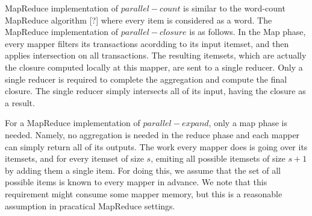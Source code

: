 MapReduce implementation of $parallel-count$ is similar to
the word-count MapReduce algorithm [?] where every item is
considered as a word. The MapReduce implementation of
$parallel-closure$ is as follows. In the Map phase, every
mapper filters its transactions acordding to its input
itemset, and then applies intersection on all transactions. 
The resulting itemsets, which are actually the
closure computed locally at this mapper, are sent to a
single reducer. Only a single reducer is required to
complete the aggregation and compute the final closure. The single
reducer simply intersects all of its input, having the
closure as a result.


For a MapReduce implementation of $parallel-expand$, only a
map phase is needed. Namely, no aggregation is needed in the
reduce phase and each mapper can simply return all of its
outputs. The work every mapper does is going over its
itemsets, and for every itemset of size $s$, emiting all
possible itemsets of size $s+1$ by adding them a single item. 
For doing this, we assume that the set of all possible items 
is known to every mapper in advance. We note that this requirement might
consume some mapper memory, but this is a reasonable assumption in pracatical 
MapReduce settings.


